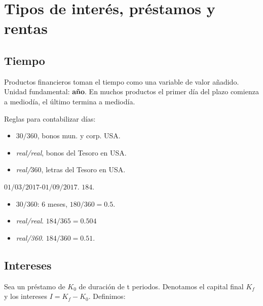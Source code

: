 \documentclass[
10pt, %
a4paper, %
oneside, %
headinclude,footinclude, %
BCOR5mm, %
]{scrartcl}
\newcommand{\n}[1]{\textbf{#1}}
\newcommand{\cur}[1]{\textit{#1}}
\newcommand{\verde}{\color{verde}}
\newcommand{\sub}[1]{_{#1}}
\newcommand{\f}[1]{{\large{${#1}$}}}
\newcounter{ex}
\newcommand{\ejemplo}{\vspace{0.4cm} {\verde{Ejemplo \arabic{ex}.}}\addtocounter{ex}{1} }
\begin{document}
\section{Tipos de interés, préstamos y rentas}

	\subsection{Tiempo}

		Productos financieros toman el tiempo como una variable de valor añadido. Unidad fundamental: \n{año}. En muchos productos el primer día del plazo comienza a mediodía, el último termina a mediodía.

		\begin{multicols}{2}
		Reglas para contabilizar días:
		\begin{itemize}
			\item \f{30/360}, bonos mun. y corp. USA.
			\item \cur{real/real}, bonos del Tesoro en USA.
			\item \cur{real/}\f{360}, letras del Tesoro en USA.
		\end{itemize}

		\breakcolumn 

		\ejemplo \f{01/03/2017}-\f{01/09/2017}. \f{184}. 
		\begin{itemize}
			\item \f{30/360}: 6 meses, \f{180/360 = 0.5}.
			\item \cur{real/real}. \f{184/365 = 0.504}
			\item \cur{real/360}. \f{184/360 = 0.51}.
		\end{itemize}
		\end{multicols}

	\subsection{Intereses}

		Sea un préstamo de \f{K\sub{0}} de duración de t periodos. Denotamos el capital final \f{K\sub{f}} y los intereses \f{I = K\sub{f} - K\sub{0}}. Definimos:
\end{document}
